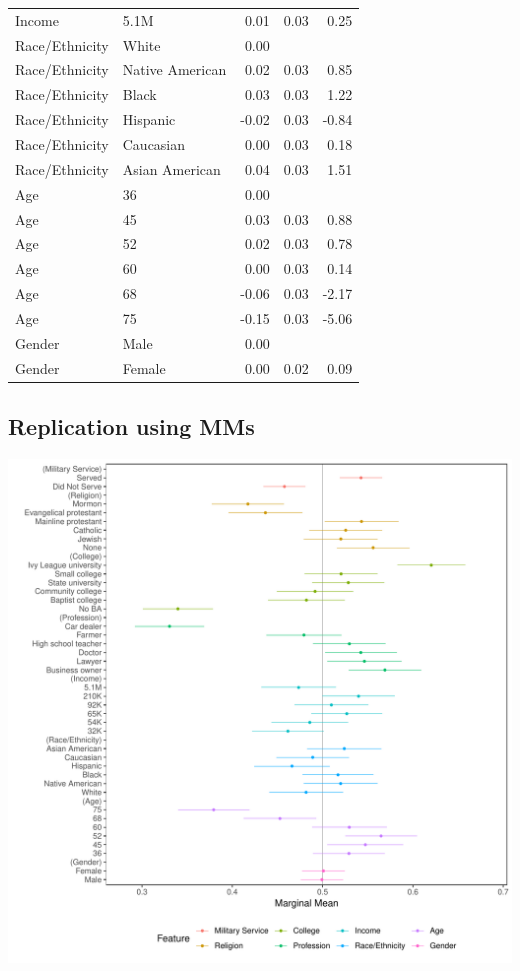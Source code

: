 \documentclass[a4paper,12pt]{article}\usepackage[]{graphicx}\usepackage[]{color}
\makeatletter
\def\maxwidth{ %
  \ifdim\Gin@nat@width>\linewidth
    \linewidth
  \else
    \Gin@nat@width
  \fi
}
\newenvironment{knitrout}{}{} %
\makeatother
\begin{document}
\begin{table}[ht]
\begin{tabular}{lp{3in}rrr}
  Income & 5.1M & 0.01 & 0.03 & 0.25 \\ 
  Race/Ethnicity & White & 0.00 &  &  \\ 
  Race/Ethnicity & Native American & 0.02 & 0.03 & 0.85 \\ 
  Race/Ethnicity & Black & 0.03 & 0.03 & 1.22 \\ 
  Race/Ethnicity & Hispanic & -0.02 & 0.03 & -0.84 \\ 
  Race/Ethnicity & Caucasian & 0.00 & 0.03 & 0.18 \\ 
  Race/Ethnicity & Asian American & 0.04 & 0.03 & 1.51 \\ 
  Age & 36 & 0.00 &  &  \\ 
  Age & 45 & 0.03 & 0.03 & 0.88 \\ 
  Age & 52 & 0.02 & 0.03 & 0.78 \\ 
  Age & 60 & 0.00 & 0.03 & 0.14 \\ 
  Age & 68 & -0.06 & 0.03 & -2.17 \\ 
  Age & 75 & -0.15 & 0.03 & -5.06 \\ 
  Gender & Male & 0.00 &  &  \\ 
  Gender & Female & 0.00 & 0.02 & 0.09 \\ 
   \hline
\end{tabular}
\endgroup
\end{table}


\clearpage

\subsection{Replication using MMs}

\begin{knitrout}
\color{fgcolor}
\includegraphics[width=\maxwidth]{figure/hainmueller_candidate_mm_appendix-1} 

\end{knitrout}
\end{document}
